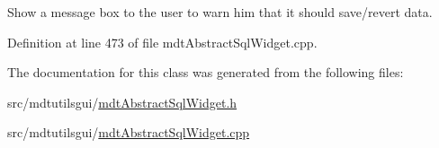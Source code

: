 Show a message box to the user to warn him that it should save/revert data. 



Definition at line 473 of file mdt\-Abstract\-Sql\-Widget.\-cpp.



The documentation for this class was generated from the following files\-:\begin{DoxyCompactItemize}
\item 
src/mdtutilsgui/\hyperlink{mdt_abstract_sql_widget_8h}{mdt\-Abstract\-Sql\-Widget.\-h}\item 
src/mdtutilsgui/\hyperlink{mdt_abstract_sql_widget_8cpp}{mdt\-Abstract\-Sql\-Widget.\-cpp}\end{DoxyCompactItemize}
